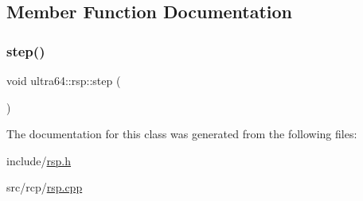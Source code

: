 \subsection{Member Function Documentation}
\mbox{\label{classultra64_1_1rsp_a888d3e8dd8c86bbc512c6afed1922b9e}} 
\subsubsection{\texorpdfstring{step()}{step()}}
{\footnotesize\ttfamily void ultra64\+::rsp\+::step (\begin{DoxyParamCaption}{ }\end{DoxyParamCaption})}



The documentation for this class was generated from the following files\+:\begin{DoxyCompactItemize}
\item 
include/\hyperlink{rsp_8h}{rsp.\+h}\item 
src/rcp/\hyperlink{rsp_8cpp}{rsp.\+cpp}\end{DoxyCompactItemize}

